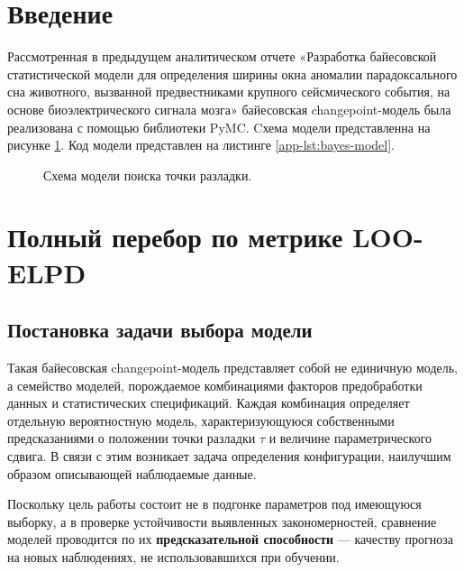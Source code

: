 \documentclass[14pt]{mmcs_article}
\begin{document}
	
	
	\renewcommand{\contentsname}{Оглавление}
	
	\tableofcontents
	
	\newpage
	\section{Введение}
	Рассмотренная в предыдущем аналитическом отчете «Разработка байесовской статистической модели для определения
	ширины окна аномалии парадоксального сна животного,
	вызванной предвестниками крупного сейсмического события,
	на основе биоэлектрического сигнала мозга» байесовская
	changepoint-модель была реализована с помощью библиотеки PyMC. Cхема модели представленна на рисунке \ref{fig:grafviz}. Код модели представлен на листинге \ref{app-lst:bayes-model}.
	
		\begin{figure}[H]
		
		\caption{Схема модели поиска точки разладки.}
		\label{fig:grafviz} %
	\end{figure}
	
	\section{Полный перебор по метрике LOO-ELPD}
	
	\subsection*{Постановка задачи выбора модели}
	 Такая байесовская
	 changepoint-модель представляет собой не единичную модель, а
	семейство моделей, порождаемое комбинациями факторов
	предобработки данных и статистических спецификаций. Каждая
	комбинация определяет отдельную вероятностную модель,
	характеризующуюся собственными предсказаниями о положении
	точки разладки $\tau$ и величине параметрического сдвига.
	В связи с этим возникает задача определения конфигурации,
	наилучшим образом описывающей наблюдаемые данные.
	
	Поскольку цель работы состоит не в подгонке параметров под
	имеющуюся выборку, а в проверке устойчивости выявленных
	закономерностей, сравнение моделей проводится по их
	\textbf{предсказательной способности} — качеству прогноза
	на новых наблюдениях, не использовавшихся при обучении.
	
\end{document}
